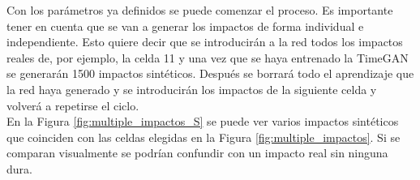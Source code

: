Con los parámetros ya definidos se puede comenzar el proceso. Es importante tener en cuenta que se van a generar los impactos de forma individual e independiente. Esto quiere decir que se introducirán a la red todos los impactos reales de, por ejemplo, la celda 11 y una vez que se haya entrenado la TimeGAN se generarán 1500 impactos sintéticos. Después se borrará todo el aprendizaje que la red haya generado y se introducirán los impactos de la siguiente celda y volverá a repetirse el ciclo. \\

En la Figura \ref{fig:multiple_impactos_S} se puede ver varios impactos sintéticos que coinciden con las celdas elegidas en la Figura \ref{fig:multiple_impactos}. Si se comparan visualmente se podrían confundir con un impacto real sin ninguna dura.

